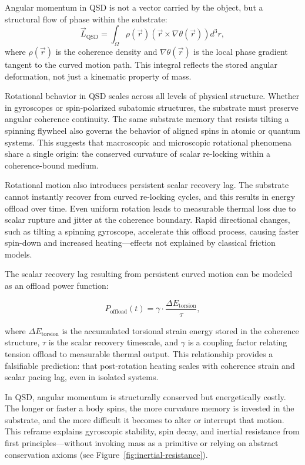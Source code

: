 \documentclass[entropy,article,submit,pdftex,moreauthors]{Definitions/mdpi}
\begin{document}
Angular momentum in QSD is not a vector carried by the object, but a structural flow of phase within the substrate:
\[
\vec{L}_{\text{QSD}} = \int_{\Omega} \rho(\vec{r}) \left( \vec{r} \times \nabla \theta(\vec{r}) \right) d^3r,
\]
where \( \rho(\vec{r}) \) is the coherence density and \( \nabla \theta(\vec{r}) \) is the local phase gradient tangent to the curved motion path. This integral reflects the stored angular deformation, not just a kinematic property of mass.

Rotational behavior in QSD scales across all levels of physical structure. Whether in gyroscopes or spin-polarized subatomic structures, the substrate must preserve angular coherence continuity. The same substrate memory that resists tilting a spinning flywheel also governs the behavior of aligned spins in atomic or quantum systems. This suggests that macroscopic and microscopic rotational phenomena share a single origin: the conserved curvature of scalar re-locking within a coherence-bound medium.

Rotational motion also introduces persistent scalar recovery lag. The substrate cannot instantly recover from curved re-locking cycles, and this results in energy offload over time. Even uniform rotation leads to measurable thermal loss due to scalar rupture and jitter at the coherence boundary. Rapid directional changes, such as tilting a spinning gyroscope, accelerate this offload process, causing faster spin-down and increased heating—effects not explained by classical friction models.

The scalar recovery lag resulting from persistent curved motion can be modeled as an offload power function:

\begin{equation}
    P_{\text{offload}}(t) = \gamma \cdot \frac{\Delta E_{\text{torsion}}}{\tau},
\end{equation}

where \( \Delta E_{\text{torsion}} \) is the accumulated torsional strain energy stored in the coherence structure, \( \tau \) is the scalar recovery timescale, and \( \gamma \) is a coupling factor relating tension offload to measurable thermal output. This relationship provides a falsifiable prediction: that post-rotation heating scales with coherence strain and scalar pacing lag, even in isolated systems.

In QSD, angular momentum is structurally conserved but energetically costly. The longer or faster a body spins, the more curvature memory is invested in the substrate, and the more difficult it becomes to alter or interrupt that motion. This reframe explains gyroscopic stability, spin decay, and inertial resistance from first principles—without invoking mass as a primitive or relying on abstract conservation axioms (see Figure~\ref{fig:inertial-resistance}).
\end{document}
